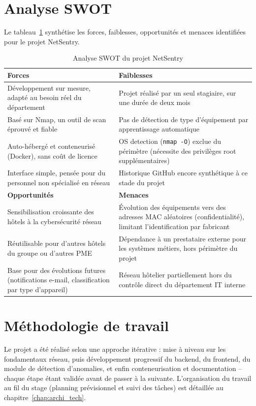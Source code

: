 \clearpage
\section{Analyse SWOT}

Le tableau~\ref{tab:swot} synthétise les forces, faiblesses, opportunités et menaces
identifiées pour le projet NetSentry.

\begin{table}[htbp]
\centering
\begin{tabular}{|p{6.3cm}|p{6.3cm}|}
\hline
\textbf{Forces} & \textbf{Faiblesses} \\
\hline
Développement sur mesure, adapté au besoin réel du département &
Projet réalisé par un seul stagiaire, sur une durée de deux mois \\
Basé sur Nmap, un outil de scan éprouvé et fiable &
Pas de détection de type d'équipement par apprentissage automatique \\
Auto-hébergé et conteneurisé (Docker), sans coût de licence &
OS detection (\texttt{nmap -O}) exclue du périmètre (nécessite des privilèges root
supplémentaires) \\
Interface simple, pensée pour du personnel non spécialisé en réseau &
Historique GitHub encore synthétique à ce stade du projet \\
\hline
\textbf{Opportunités} & \textbf{Menaces} \\
\hline
Sensibilisation croissante des hôtels à la cybersécurité réseau &
Évolution des équipements vers des adresses MAC aléatoires (confidentialité), limitant
l'identification par fabricant \\
Réutilisable pour d'autres hôtels du groupe ou d'autres PME &
Dépendance à un prestataire externe pour les systèmes métiers, hors périmètre du projet \\
Base pour des évolutions futures (notifications e-mail, classification par type
d'appareil) &
Réseau hôtelier partiellement hors du contrôle direct du département IT interne \\
\hline
\end{tabular}
\caption{Analyse SWOT du projet NetSentry}
\label{tab:swot}
\end{table}

\section{Méthodologie de travail}

Le projet a été réalisé selon une approche itérative : mise à niveau sur les
fondamentaux réseau, puis développement progressif du backend, du frontend, du module de
détection d'anomalies, et enfin conteneurisation et documentation -- chaque étape étant
validée avant de passer à la suivante. L'organisation du travail au fil du stage (planning
prévisionnel et suivi des tâches) est détaillée au chapitre~\ref{chap:archi_tech}.

